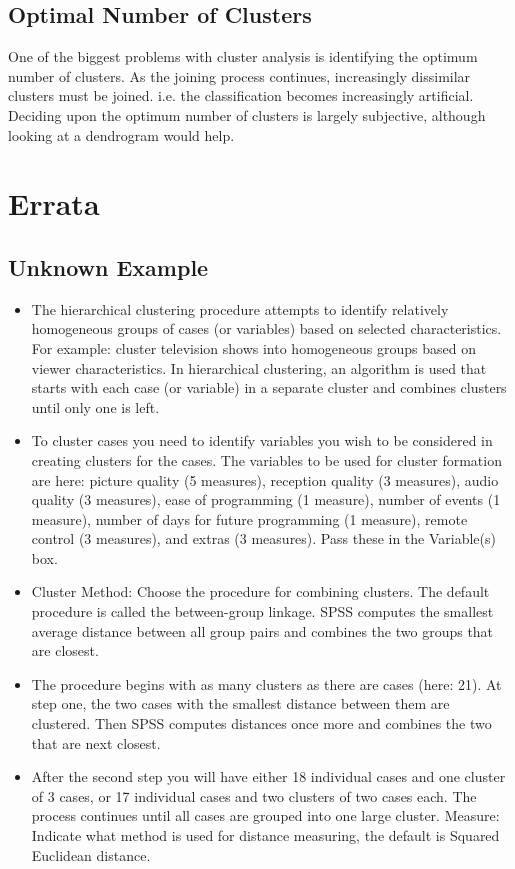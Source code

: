 \subsection{Optimal Number of Clusters}
One of the biggest problems with cluster analysis is identifying the optimum number of
clusters. As the joining process continues, increasingly dissimilar clusters must be joined. i.e. the classification becomes increasingly artificial. Deciding upon the optimum number
of clusters is largely subjective, although looking at a dendrogram would help.





\newpage
\section{Errata}
\subsection{Unknown Example}
\begin{itemize}
	\item 
	The hierarchical clustering procedure attempts to identify relatively homogeneous groups of cases (or variables) based on selected
	characteristics. For example: cluster television shows into homogeneous groups based on viewer
	characteristics. In hierarchical clustering, an algorithm is used that starts with each case (or variable) in a
	separate cluster and combines clusters until only one is left.
	\item 
	
	
	To cluster cases you need to identify variables you wish to be considered in creating clusters for the cases.
	The variables to be used for cluster formation are here: picture quality (5 measures), reception quality (3
	measures), audio quality (3 measures), ease of programming (1 measure), number of events (1 measure),
	number of days for future programming (1 measure), remote control (3 measures), and extras (3 measures).
	Pass these in the Variable(s) box.
	\item 
	Cluster Method: Choose the procedure for combining clusters. The default procedure is called the
	between-group linkage. SPSS computes the smallest average distance between all group pairs and
	combines the two groups that are closest. 
	\item The procedure begins with as many clusters as there are cases
	(here: 21). At step one, the two cases with the smallest distance between them are clustered. Then SPSS
	computes distances once more and combines the two that are next closest. 
	\item After the second step you will
	have either 18 individual cases and one cluster of 3 cases, or 17 individual cases and two clusters of two
	cases each. The process continues until all cases are grouped into one large cluster.
	Measure: Indicate what method is used for distance measuring, the default is Squared Euclidean distance. 
\end{itemize}